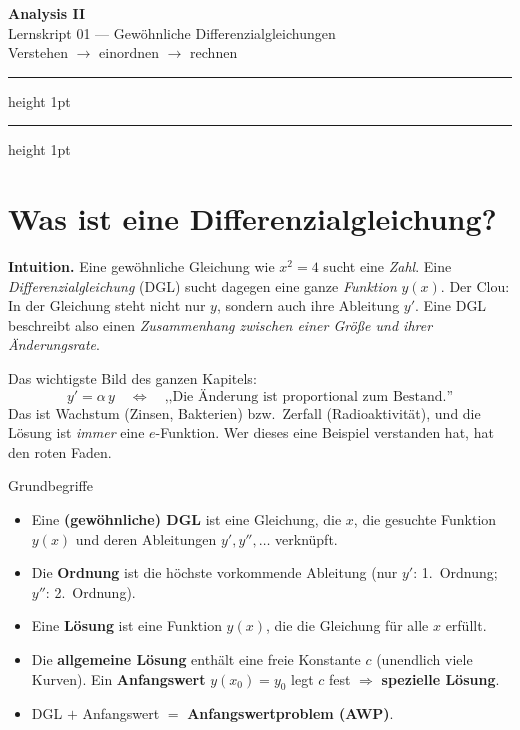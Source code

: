 \documentclass[a4paper,11pt]{article}
\begin{document}
\begin{center}
  {\color{accent}\Huge\bfseries Analysis II}\\[0.3em]
  {\Large Lernskript 01 — Gewöhnliche Differenzialgleichungen}\\[0.4em]
  {\color{gridcol}\small Verstehen $\to$ einordnen $\to$ rechnen}
\end{center}
\vspace{0.4em}
{\color{gridcol}\hrule height 1pt}
\vspace{0.8em}

{\color{fgtext}\tableofcontents}
\vspace{0.6em}
{\color{gridcol}\hrule height 1pt}

\section{Was ist eine Differenzialgleichung?}

\textbf{Intuition.} Eine gewöhnliche Gleichung wie $x^2=4$ sucht eine \emph{Zahl}.
Eine \emph{Differenzialgleichung} (DGL) sucht dagegen eine ganze \emph{Funktion} $y(x)$.
Der Clou: In der Gleichung steht nicht nur $y$, sondern auch ihre Ableitung $y'$. Eine
DGL beschreibt also einen \emph{Zusammenhang zwischen einer Größe und ihrer Änderungs\-rate}.

Das wichtigste Bild des ganzen Kapitels:
\[
  y' = \alpha\, y \quad\Longleftrightarrow\quad
  \text{,,Die Änderung ist proportional zum Bestand.''}
\]
Das ist Wachstum (Zinsen, Bakterien) bzw.\ Zerfall (Radioaktivität), und die Lösung ist
\emph{immer} eine $e$-Funktion. Wer dieses eine Beispiel verstanden hat, hat den roten Faden.

\begin{defbox}{Grundbegriffe}
\begin{itemize}[leftmargin=1.4em,itemsep=2pt]
  \item Eine \textbf{(gewöhnliche) DGL} ist eine Gleichung, die $x$, die gesuchte Funktion
        $y(x)$ und deren Ableitungen $y',y'',\dots$ verknüpft.
  \item Die \textbf{Ordnung} ist die höchste vorkommende Ableitung
        (nur $y'$: 1.\ Ordnung;\ $y''$: 2.\ Ordnung).
  \item Eine \textbf{Lösung} ist eine Funktion $y(x)$, die die Gleichung für alle $x$ erfüllt.
  \item Die \textbf{allgemeine Lösung} enthält eine freie Konstante $c$ (unendlich viele Kurven).
        Ein \textbf{Anfangswert} $y(x_0)=y_0$ legt $c$ fest $\Rightarrow$ \textbf{spezielle Lösung}.
  \item DGL $+$ Anfangswert $=$ \textbf{Anfangswertproblem (AWP)}.
\end{itemize}
\end{defbox}
\end{document}
